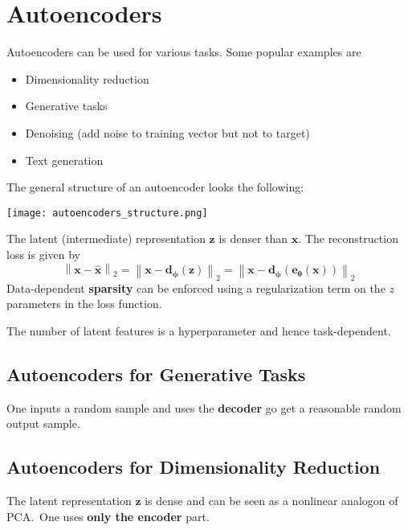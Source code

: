 \section{Autoencoders}
Autoencoders can be used for various tasks. Some popular examples are
\begin{itemize}
    \item Dimensionality reduction
    \item Generative tasks
    \item Denoising (add noise to training vector but not to target)
    \item Text generation
\end{itemize}
The general structure of an autoencoder looks the following:
\begin{center}
    \texttt{[image: autoencoders\_structure.png]}
\end{center}
The latent (intermediate) representation $\mathbf{z}$ is denser than $\mathbf{x}$. The reconstruction loss is given by
\begin{equation*}
    \left\|\mathbf{x}-\hat{\mathbf{x}}\right\|_2=\left\|\mathbf{x}-\mathbf{d_\phi}(\mathbf{z})\right\|_2=\left\|\mathbf{x}-\mathbf{d_\phi}(\mathbf{e_\theta}(\mathbf{x}))\right\|_2
\end{equation*}
Data-dependent \textbf{sparsity} can be enforced using a regularization term on the $z$ parameters in the loss function.

\newpar{}

The number of latent features is a hyperparameter and hence task-dependent.

\subsection{Autoencoders for Generative Tasks}
One inputs a random sample and uses the \textbf{decoder} go get a reasonable random output sample.

\subsection{Autoencoders for Dimensionality Reduction}
The latent representation $\mathbf{z}$ is dense and can be seen as a nonlinear analogon of PCA.\ One uses \textbf{only the encoder} part.

